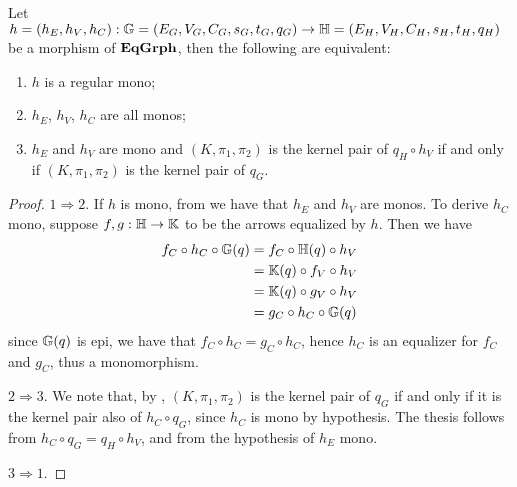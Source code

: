 \begin{cor}\label{cor:regmono}Let $ h = (h_E, h_V, h_C): \mathbb{G} = (E_G, V_G, C_G, s_G, t_G, q_G) \to \mathbb{H} = (E_H, V_H, C_H, s_H, t_H, q_H)$ be a morphism of $\mathbf{EqGrph}$, then the following are equivalent:
	\begin{enumerate}
		\item $h$ is a regular mono;
		\item $h_E$, $h_V$, $h_C$ are all monos;
            \item $h_E$ and $h_V$ are mono and $(K, \pi_1, \pi_2)$ is the kernel pair of $q_H \circ h_V$ if and only if $(K, \pi_1, \pi_2)$ is the kernel pair of $q_G$.
	\end{enumerate}
\end{cor}
\begin{proof}
	$1\Rightarrow 2.$ If $h$ is mono, from  we have that $h_E$ and $h_V$ are monos. To derive $h_C$ mono, suppose $f, g :  \mathbb{H \to K}$ to be the arrows equalized by $h$. Then we have
    \begin{align*}
        f_C \circ h_C \circ \mathbb{G}(q)  &=  f_C \circ \mathbb{H}(q) \circ h_V \\
                                            &=  \mathbb{K}(q) \circ f_V \circ h_V \\
                                            &=  \mathbb{K}(q) \circ g_V \circ h_V \\
                                            &=  g_C \circ h_C \circ \mathbb{G}(q)
    \end{align*}
    since $\mathbb{G}(q)$ is epi, we have that $f_C \circ h_C = g_C \circ h_C$, hence $h_C$ is an equalizer for $f_C$ and $g_C$, thus a monomorphism.
	
	\smallskip \noindent
        \smallskip \noindent
	$2\Rightarrow 3.$ We note that, by , $(K, \pi_1, \pi_2)$ is the kernel pair of $q_G$ if and only if it is the kernel pair also of $h_C \circ q_G$, since $h_C$ is mono by hypothesis. The thesis follows from $h_C \circ q_G = q_H \circ h_V$, and from the hypothesis of $h_E$ mono.
	
	\smallskip \noindent 
	$3\Rightarrow 1.$ \color{green}{idea: force the comm. of the diagram on the last two components to obtain the two arrows that are equalized, and show that the condition in 3 is sufficient to conclude reg. mono} \color{black}
\end{proof}

